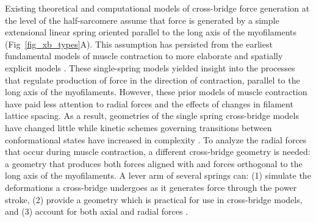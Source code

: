 \documentclass[10pt]{article}
\newcommand{\citep}[1]{\cite{#1}} %
\begin{document}
Existing theoretical and computational models of cross-bridge force generation at the level of the half-sarcomere assume that force is generated by a simple extensional linear spring oriented parallel to the long axis of the myofilaments (Fig~\ref{fig_xb_types}A). 
This assumption has persisted from the earliest fundamental models of muscle contraction to more elaborate and spatially explicit models \citep{Huxley1957, Daniel1998, Chase2004, Tanner2007, Campbell2009}.  
These single-spring models yielded insight into the processes that regulate production of force in the direction of contraction, parallel to the long axis of the myofilaments.
However, these prior models of muscle contraction have paid less attention to radial forces and the effects of changes in filament lattice spacing. 
As a result, geometries of the single spring cross-bridge models have changed little while kinetic schemes governing transitions between conformational states have increased in complexity \citep{Huxley1957, Pate1989, Daniel1998, Smith2008a}. 
To analyze the radial forces that occur during muscle contraction, a different cross-bridge geometry is needed: a geometry that produces both forces aligned with and forces orthogonal to the long axis of the myofilaments. 
A lever arm of several springs can: (1) simulate the deformations a cross-bridge undergoes as it generates force through the power stroke, (2) provide a geometry which is practical for use in cross-bridge models, and (3) account for both axial and radial forces \citep{Houdusse2001}.  
\end{document}
